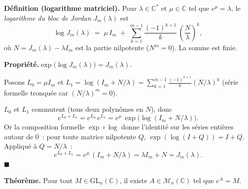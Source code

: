\decsep{}


\begin{tcolorbox}[thmbox]
  \textbf{Définition (logarithme matriciel).}\enspace%
  Pour $\lambda \in \mathbb{C}^*$ et $\mu \in \mathbb{C}$ tel que $e^\mu = \lambda$,
  le \emph{logarithme du bloc de Jordan} $J_m(\lambda)$ est
  \[
    \log J_m(\lambda)
    \;=\;
    \mu\,I_m \;+\; \sum_{k=1}^{m-1} \frac{{(-1)}^{k+1}}{k}\,
    \left(\frac{N}{\lambda}\right)^{\!k},
  \]
  où $N = J_m(\lambda) - \lambda I_m$ est la partie nilpotente ($N^m = 0$).
  La somme est finie.

  \medskip
  \textbf{Propriété.}\enspace $\exp\!\bigl(\log J_m(\lambda)\bigr) = J_m(\lambda)$.
\end{tcolorbox}


\begin{mdframed}[style=proofbar]
  Posons $L_0 = \mu I_m$ et $L_1 = \log(I_m + N/\lambda)
  = \sum_{k=1}^{m-1}\frac{{(-1)}^{k+1}}{k}{(N/\lambda)}^k$ (série formelle
  tronquée car ${(N/\lambda)}^m = 0$).

  $L_0$ et $L_1$ commutent (tous deux polynômes en $N$), donc
  \[
    e^{L_0 + L_1} = e^{L_0}\,e^{L_1} = e^\mu\,\exp\!\bigl(\log(I_m + N/\lambda)\bigr).
  \]
  Or la composition formelle $\exp \circ \log$ donne l'identité sur les
  séries entières autour de $0$~: pour toute matrice nilpotente $Q$,
  $\exp(\log(I+Q)) = I + Q$. Appliqué à $Q = N/\lambda$~:
  \[
    e^{L_0+L_1} = e^\mu\,(I_m + N/\lambda) = \lambda I_m + N = J_m(\lambda).
  \]
  \hfill$\blacksquare$
\end{mdframed}

\decsep{}


\begin{tcolorbox}[thmbox]
  \textbf{Théorème.}\enspace
  Pour tout $M \in \mathrm{GL}_n(\mathbb{C})$, il existe
  $A \in \mathcal{M}_n(\mathbb{C})$ tel que $e^A = M$.
\end{tcolorbox}

